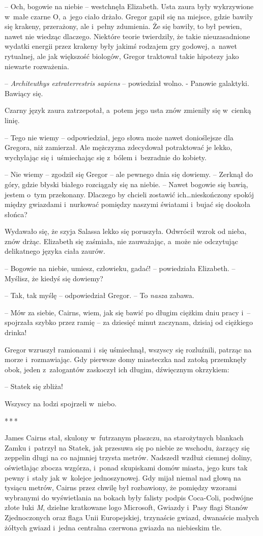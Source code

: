 \documentclass[oneside,polish,12pt,sfheadings]{mwbk}
\newcommand{\threeast}{\bigskip\par\centerline{*\,*\,*}\medskip\par}%
\begin{document}
-- Och, bogowie na niebie -- westchnęła Elizabeth. Usta zaura były
wykrzywione w~małe czarne O, a~jego ciało drżało. Gregor gapił się na
miejsce, gdzie bawiły się krakeny, przerażony, ale i~pełny zdumienia. Że
się bawiły, to był pewien, nawet nie wiedząc dlaczego. Niektóre teorie
twierdziły, że takie nieuzasadnione wydatki energii przez krakeny były
jakimś rodzajem gry godowej, a~nawet rytualnej, ale jak większość
biologów, Gregor traktował takie hipotezy jako niewarte rozważenia.

-- \emph{Architeuthys extraterrestris sapiens }-- powiedział wolno. -
Panowie galaktyki. Bawiący się.

Czarny język zaura zatrzepotał, a~potem jego usta znów zmieniły się w~cienką linię.

-- Tego nie wiemy -- odpowiedział, jego słowa może nawet donioślejsze dla
Gregora, niż zamierzał. Ale mężczyzna zdecydował potraktować je lekko,
wychylając się i~uśmiechając się z~bólem i~bezradnie do kobiety.

-- Nie wiemy -- zgodził się Gregor -- ale pewnego dnia się dowiemy. --
Zerknął do góry, gdzie błyski białego rozciągały się na niebie. -- Nawet
bogowie się bawią, jestem o~tym przekonany. Dlaczego by chcieli zostawić
ich\ldots nieskończony spokój między gwiazdami i~nurkować pomiędzy naszymi
światami i~bujać się dookoła słońca?

Wydawało się, że szyja Salassa lekko się poruszyła. Odwrócił wzrok od
nieba, znów drżąc. Elizabeth się zaśmiała, nie zauważając, a~może nie
odczytując delikatnego języka ciała zaurów. 

-- Bogowie na niebie, umiesz,
człowieku, gadać! -- powiedziała Elizabeth. -- Myślisz, że kiedyś się
dowiemy?

-- Tak, tak myślę -- odpowiedział Gregor. -- To \emph{nasza} zabawa.

-- Mów za siebie, Cairns, wiem, jak się bawić po długim ciężkim dniu
pracy i~-- spojrzała szybko przez ramię -- za dziesięć minut zaczynam,
dzisiaj od ciężkiego drinka!

Gregor wzruszył ramionami i~się uśmiechnął, wszyscy się rozluźnili,
patrząc na morze i~rozmawiając. Gdy pierwsze domy miasteczka nad zatoką
przemknęły obok, jeden z~załogantów zaskoczył ich długim, dźwięcznym
okrzykiem:

-- Statek się zbliża!

Wszyscy na łodzi spojrzeli w~niebo.

\threeast

James Cairns stał, skulony w~futrzanym płaszczu, na starożytnych
blankach Zamku i~patrzył na Statek, jak przesuwa się po niebie ze
wschodu, żarzący się zeppelin długi na co najmniej trzysta metrów.
Nadszedł wzdłuż ciemnej doliny, oświetlając zbocza wzgórza, i~ponad
skupiskami domów miasta, jego kurs tak pewny i~stały jak w~kolejce
jednoszynowej. Gdy mijał niemal nad głową na tysiącu metrów, Cairns
przez chwilę był rozbawiony, że pomiędzy wzorami wybranymi do
wyświetlania na bokach były falisty podpis Coca-Coli, podwójne złote
łuki \emph{M}, dzielne kratkowane logo Microsoft, Gwiazdy i~Pasy flagi
Stanów Zjednoczonych oraz flaga Unii Europejskiej, trzynaście gwiazd,
dwanaście małych żółtych gwiazd i~jedna centralna czerwona gwiazda na
niebieskim tle.
\end{document}
